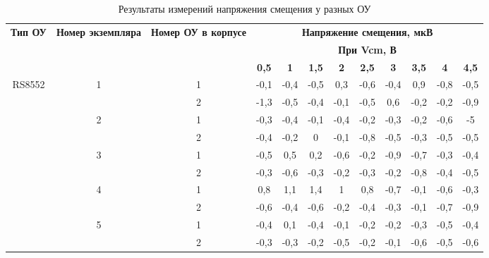   \begin{table}[H]
    \centering
    \caption{Результаты измерений напряжения смещения у разных ОУ}
      \begin{tabular}{|c|c|c|c|c|c|c|c|c|c|c|c|}
      \hline
      \multicolumn{1}{|c|}{\multirow{3}[6]{2cm}{\textbf{Тип ОУ}}} & \multicolumn{1}{c|}{\multirow{3}[6]{1.4cm}{\textbf{Номер экземпляра}}} & \multicolumn{1}{c|}{\multirow{3}[6]{1.8cm}{\textbf{Номер ОУ в корпусе}}} & \multicolumn{9}{|c|}{\textbf{Напряжение смещения, мкВ}} \bigstrut\\
  \cline{4-12}          &       &       & \multicolumn{9}{|c|}{\textbf{При Vcm, В}} \bigstrut\\
  \cline{4-12}          &       &       & \textbf{0,5} & \textbf{1} & \textbf{1,5} & \textbf{2} & \textbf{2,5} & \textbf{3} & \textbf{3,5} & \textbf{4} & \textbf{4,5} \bigstrut\\
      \hline
      \multicolumn{1}{|c|}{\multirow{10}[20]{*}{RS8552}} & \multirow{2}[4]{*}{1} & 1     & -0,1  & -0,4  & -0,5  & 0,3   & -0,6  & -0,4  & 0,9   & -0,8  & -0,5 \bigstrut\\
  \cline{3-12}          &       & 2     & -1,3  & -0,5  & -0,4  & -0,1  & -0,5  & 0,6   & -0,2  & -0,2  & -0,9 \bigstrut\\
  \cline{2-12}          & \multirow{2}[4]{*}{2} & 1     & -0,3  & -0,4  & -0,1  & -0,4  & -0,2  & -0,3  & -0,2  & -0,6  & -5 \bigstrut\\
  \cline{3-12}          &       & 2     & -0,4  & -0,2  & 0     & -0,1  & -0,8  & -0,5  & -0,3  & -0,5  & -0,5 \bigstrut\\
  \cline{2-12}          & \multirow{2}[4]{*}{3} & 1     & -0,5  & 0,5   & 0,2   & -0,6  & -0,2  & -0,9  & -0,7  & -0,3  & -0,4 \bigstrut\\
  \cline{3-12}          &       & 2     & -0,3  & -0,6  & -0,3  & -0,2  & -0,3  & -0,2  & -0,8  & -0,4  & -0,5 \bigstrut\\
  \cline{2-12}          & \multirow{2}[4]{*}{4} & 1     & 0,8   & 1,1   & 1,4   & 1     & 0,8   & -0,7  & -0,1  & -0,6  & -0,3 \bigstrut\\
  \cline{3-12}          &       & 2     & -0,6  & -0,4  & -0,6  & -0,2  & -0,4  & -0,3  & -0,1  & -0,7  & -0,9 \bigstrut\\
  \cline{2-12}          & \multirow{2}[4]{*}{5} & 1     & -0,4  & 0,1   & -0,4  & -0,1  & -0,2  & -0,2  & -0,3  & -0,5  & -0,4 \bigstrut\\
  \cline{3-12}          &       & 2     & -0,3  & -0,3  & -0,2  & -0,5  & -0,2  & -0,1  & -0,6  & -0,5  & -0,6 \bigstrut\\

\end{tabular}
\end{table}
